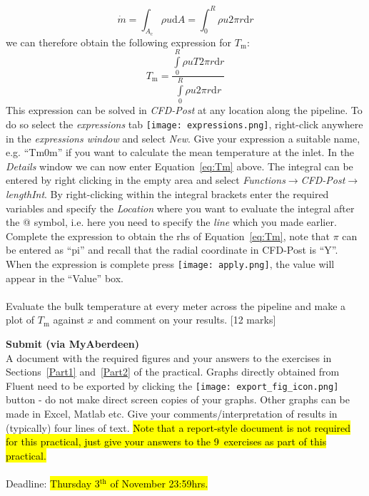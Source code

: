 \documentclass[11pt,a4paper,oneside]{scrartcl}
\begin{document}
\begin{enumerate}
    \begin{equation}
        \dot{m}=\int_{A_\mathrm{c}} \rho u \mathrm{d}A=\int_0^R\rho u 2\pi r \mathrm{d}r%
    \end{equation}
    we can therefore obtain the following expression for $T_\mathrm{m}$:
    \begin{equation}\label{eq:Tm}
        T_\mathrm{m}=\frac{\int\limits_0^R\rho uT2\pi r\mathrm{d}r}{\int\limits_0^R\rho u 2\pi r \mathrm{d}r}
    \end{equation}
    This expression can be solved in \emph{CFD-Post} at any location along the pipeline. To do so select the \emph{expressions} tab \texttt{[image: expressions.png]}, right-click anywhere in the \emph{expressions window} and select \emph{New}. Give your expression a suitable name, e.g. ``Tm0m'' if you want to calculate the mean temperature at the inlet. In the \emph{Details} window we can now enter Equation~\ref{eq:Tm} above. The integral can be entered by right clicking in the empty area and select \emph{Functions$\rightarrow$CFD-Post$\rightarrow$lengthInt}. By right-clicking within the integral brackets enter the required variables and specify the \emph{Location} where you want to evaluate the integral after the @ symbol, i.e. here you need to specify the \emph{line} which you made earlier. Complete the expression to obtain the rhs of Equation~\ref{eq:Tm}, note that $\pi$ can be entered as ``pi'' and recall that the radial coordinate in CFD-Post is ``Y''. When the expression is complete press \texttt{[image: apply.png]}, the value will appear in the ``Value'' box.
    \\
    \\
    Evaluate the bulk temperature at every meter across the pipeline and make a plot of $T_\mathrm{m}$ against $x$ and comment on your results. [12 marks]
\end{enumerate}

\vspace{1cm}

\textbf{Submit (via MyAberdeen)}\\
A document with the required figures and your answers to the exercises in Sections~\ref{Part1} and~\ref{Part2} of the practical. Graphs directly obtained from Fluent need to be exported by clicking the \texttt{[image: export\_fig\_icon.png]} button - do not make direct screen copies of your graphs. Other graphs can be made in Excel, Matlab etc. Give your comments/interpretation of results in (typically) four lines of text. \hl{Note that a report-style document is not required for this practical, just give your answers to the 9~exercises as part of this practical.}
\\
\\
Deadline: \hl{Thursday 3$^\mathrm{th}$ of November 23:59hrs.}
\end{document}
